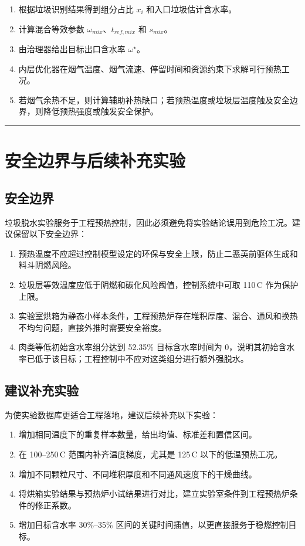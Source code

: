\documentclass[UTF8,openany,zihao=-4,oneside]{ctexbook}
\newcommand{\manualdivider}{\par\vspace{0.6em}\noindent\textcolor{FGLine}{\rule{\linewidth}{0.7pt}}\vspace{0.6em}\par}
\begin{document}
\begin{enumerate}
\item 根据垃圾识别结果得到组分占比 $x_i$ 和入口垃圾估计含水率。
\item 计算混合等效参数 $\omega_{mix}$、$t_{ref,mix}$ 和 $s_{mix}$。
\item 由治理器给出目标出口含水率 $\omega^\star$。
\item 内层优化器在烟气温度、烟气流速、停留时间和资源约束下求解可行预热工况。
\item 若烟气余热不足，则计算辅助补热缺口；若预热温度或垃圾层温度触及安全边界，则降低预热强度或触发安全保护。
\end{enumerate}

\manualdivider

\chapter{安全边界与后续补充实验}

\section{安全边界}

垃圾脱水实验服务于工程预热控制，因此必须避免将实验结论误用到危险工况。建议保留以下安全边界：

\begin{enumerate}
\item 预热温度不应超过控制模型设定的环保与安全上限，防止二恶英前驱体生成和料斗阴燃风险。
\item 垃圾层等效温度应低于阴燃和碳化风险阈值，控制系统中可取 110\,\textdegree C 作为保护上限。
\item 实验室烘箱为静态小样本条件，工程预热炉存在堆积厚度、混合、通风和换热不均匀问题，直接外推时需要安全裕度。
\item 肉类等低初始含水率组分达到 52.35\% 目标含水率时间为 0，说明其初始含水率已低于该目标；工程控制中不应对这类组分进行额外强脱水。
\end{enumerate}

\section{建议补充实验}

为使实验数据库更适合工程落地，建议后续补充以下实验：

\begin{enumerate}
\item 增加相同温度下的重复样本数量，给出均值、标准差和置信区间。
\item 在 100--250\,\textdegree C 范围内补齐温度梯度，尤其是 125\,\textdegree C 以下的低温预热工况。
\item 增加不同颗粒尺寸、不同堆积厚度和不同通风速度下的干燥曲线。
\item 将烘箱实验结果与预热炉小试结果进行对比，建立实验室条件到工程预热炉条件的修正系数。
\item 增加目标含水率 30\%--35\% 区间的关键时间插值，以更直接服务于稳燃控制目标。
\end{enumerate}
\end{document}
